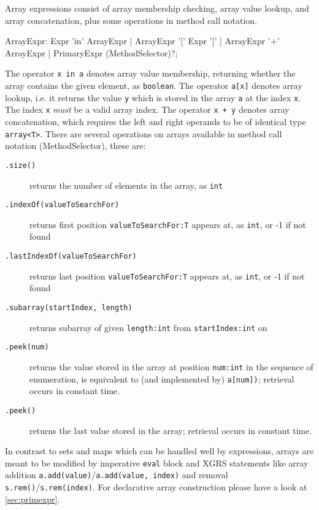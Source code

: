 Array expressions consist of array membership checking, array value lookup, and array concatenation, plus some operations in method call notation.

\begin{rail}
  ArrayExpr: Expr 'in' ArrayExpr | ArrayExpr '[' Expr ']' | ArrayExpr '+' ArrayExpr | PrimaryExpr (MethodSelector)?;
\end{rail}

The operator \texttt{x in a} denotes array value membership, returning whether the array contains the given element, as \texttt{boolean}.
The operator \texttt{a[x]} denotes array lookup, i.e. it returns the value \texttt{y} which is stored in the array \texttt{a} at the index \texttt{x}.
The index \texttt{x} \emph{must} be a valid array index.
The operator \texttt{x + y} denotes array concatenation, which requires the left and right operands to be of identical type \verb#array<T>#.
There are several operations on arrays available in method call notation (MethodSelector), these are:

\begin{description}
\item[\texttt{.size()}] returns the number of elements in the array, as \texttt{int}
\item[\texttt{.indexOf(valueToSearchFor)}] returns first position \texttt{valueToSearchFor:T} appears at, as \texttt{int}, or -1 if not found
\item[\texttt{.lastIndexOf(valueToSearchFor)}] returns last position \texttt{valueToSearchFor:T} appears at, as \texttt{int}, or -1 if not found
\item[\texttt{.subarray(startIndex, length)}] returns subarray of given \texttt{length:int} from \texttt{startIndex:int} on
\item[\texttt{.peek(num)}] returns the value stored in the array at position \texttt{num:int} in the sequence of enumeration, is equivalent to (and implemented by) \texttt{a[num])}; retrieval occurs in constant time.
\item[\texttt{.peek()}] returns the last value stored in the array; retrieval occurs in constant time.
\end{description}

\begin{note}
In contrast to sets and maps which can be handled well by expressions, arrays are meant to be modified by imperative \texttt{eval} block and XGRS statements like array addition \texttt{a.add(value)}/\texttt{a.add(value, index)} and removal \texttt{s.rem()}/\texttt{s.rem(index)}.
For declarative array construction please have a look at \ref{sec:primexpr}.
\end{note}


